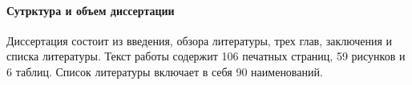 \paragraph{Сутрктура и объем диссертации}

Диссертация состоит из введения, обзора литературы, трех глав, заключения и списка литературы. Текст работы содержит 106 печатных страниц, 59 рисунков и 6 таблиц. Список литературы включает в себя 90 наименований. 

